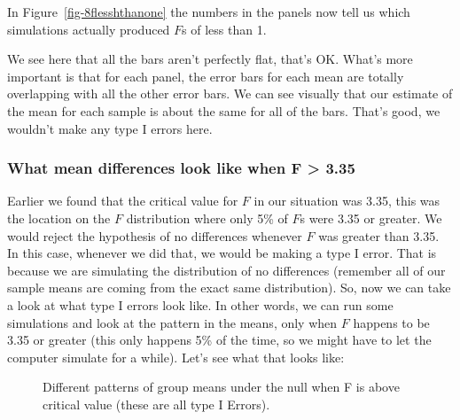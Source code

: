 \documentclass[
  letterpaper,
  DIV=11,
  numbers=noendperiod]{scrreprt}
\begin{document}
In Figure~\ref{fig-8flesshthanone} the numbers in the panels now tell us
which simulations actually produced \(F\)s of less than 1.

We see here that all the bars aren't perfectly flat, that's OK. What's
more important is that for each panel, the error bars for each mean are
totally overlapping with all the other error bars. We can see visually
that our estimate of the mean for each sample is about the same for all
of the bars. That's good, we wouldn't make any type I errors here.

\subsubsection{What mean differences look like when F \textgreater{}
3.35}\label{what-mean-differences-look-like-when-f-3.35}

Earlier we found that the critical value for \(F\) in our situation was
3.35, this was the location on the \(F\) distribution where only 5\% of
\(F\)s were 3.35 or greater. We would reject the hypothesis of no
differences whenever \(F\) was greater than 3.35. In this case, whenever
we did that, we would be making a type I error. That is because we are
simulating the distribution of no differences (remember all of our
sample means are coming from the exact same distribution). So, now we
can take a look at what type I errors look like. In other words, we can
run some simulations and look at the pattern in the means, only when
\(F\) happens to be 3.35 or greater (this only happens 5\% of the time,
so we might have to let the computer simulate for a while). Let's see
what that looks like:

\begin{figure}


\caption{\label{fig-8sigdiffs}Different patterns of group means under
the null when F is above critical value (these are all type I Errors).}

\end{figure}%
\end{document}
